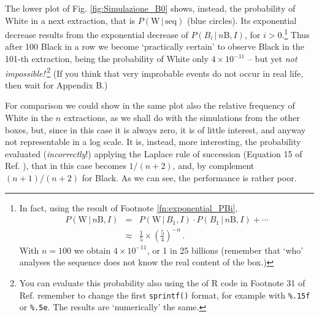 \documentclass[11pt]{article}
\begin{document}
The lower plot of Fig. \ref{fig:Simulazione_B0} shows, instead,
the probability of White in a next extraction, that
is $P(\mbox{W}\,|\,\mbox{seq})$ (blue circles). Its exponential
decrease results 
from the exponential decrease of 
$P(B_i\,|\,n\mbox{B},I)$, for $i>0$.\footnote{In fact, 
using the result of Footnote
\ref{fn:exponential_PBi}, 
\begin{eqnarray*}
P(\mbox{W}\,|\,n\mbox{B},I) &=& 
  P(\mbox{W}\,|\,B_1,I)\cdot P(B_1\,|\,n\mbox{B},I) + \cdots \\
   &\approx& \frac{1}{5}\times \left(\frac{5}{4}\right)^{-n} \,.
\end{eqnarray*}
With $n=100$ we obtain $4\times 10^{-11}$, or 1 in 25 billions
(remember that `who'  analyses the sequence does not know the real content
of the box.) 
} 
Thus after 100 Black in a row 
we become 
`practically certain' to observe Black
in the 101-th extraction, being the probability of White only 
$4\times 10^{-11}$ -- but yet
{\em not impossible!}\,\footnote{You can 
evaluate this probability also  using the 
 of R code in  Footnote 31 of Ref. \cite{ME2016} remember to
change the first \verb|sprintf()| format, for example with 
\verb|%.15f| or \verb|%.5e|. The results are
`numerically' the same.}
(If you think that very improbable events do not occur
in real life, then wait for Appendix B.)

For comparison we could show in the same plot also the relative
frequency of White in the $n$ extractions, as we shall do with the
simulations from the other boxes, but, since in this case
it is always zero, it is of little interest, and 
anyway not representable in a log scale. 
It is, instead, more interesting, the probability
evaluated
({\em incorrectly}!) applying the 
Laplace rule of succession (Equation 15 of Ref. \cite{ME2016}),
that in this case becomes $1/(n+2)$, and, 
by complement $(n+1)/(n+2)$ for Black. 
As we can see, the performance is rather poor.
\end{document}
